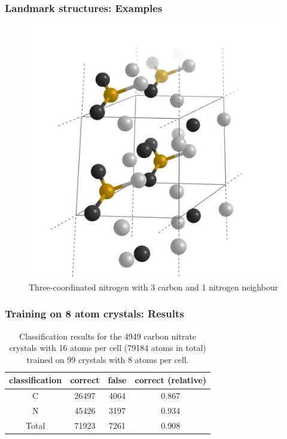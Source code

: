 \documentclass{beamer}
\begin{document}
\begin{frame}
  \frametitle{Landmark structures: Examples}
    \begin{figure}[h!]
    \includegraphics[scale=0.19]{Figures/landmark4.png}
    \caption{Three-coordinated nitrogen with 3 carbon and 1 nitrogen neighbour}
    \label{fig:const} 
  \end{figure}
\end{frame}

\begin{frame}
  \frametitle{Training on 8 atom crystals: Results}
  \begin{table}[h!]
    \center
    \begin{tabular}{c|c|c|c}
      classification & correct & false & correct (relative) \\ \hline
      C              & 26497   & 4064  & 0.867              \\ \hline
      N              & 45426   & 3197  & 0.934              \\ \hline
      Total          & 71923   & 7261  & 0.908             
    \end{tabular}
    \caption{Classification results for the 4949 carbon nitrate crystals with 16 atoms per cell (79184 atoms in total) trained on 99 crystals with 8 atoms per cell.}
    \label{table:res1}
  \end{table}
\end{frame}
\end{document}
